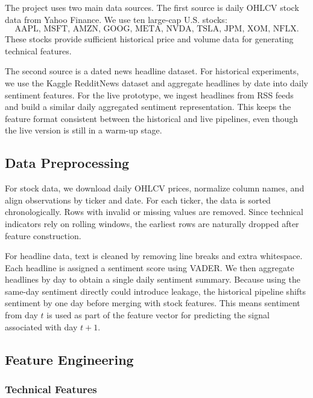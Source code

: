 \documentclass[11pt]{article}
\begin{document}
The project uses two main data sources. The first source is daily OHLCV stock data from Yahoo Finance. We use ten large-cap U.S. stocks:
\[
\text{AAPL, MSFT, AMZN, GOOG, META, NVDA, TSLA, JPM, XOM, NFLX.}
\]
These stocks provide sufficient historical price and volume data for generating technical features.

The second source is a dated news headline dataset. For historical experiments, we use the Kaggle RedditNews dataset and aggregate headlines by date into daily sentiment features. For the live prototype, we ingest headlines from RSS feeds and build a similar daily aggregated sentiment representation. This keeps the feature format consistent between the historical and live pipelines, even though the live version is still in a warm-up stage.

\subsection{Data Preprocessing}

For stock data, we download daily OHLCV prices, normalize column names, and align observations by ticker and date. For each ticker, the data is sorted chronologically. Rows with invalid or missing values are removed. Since technical indicators rely on rolling windows, the earliest rows are naturally dropped after feature construction.

For headline data, text is cleaned by removing line breaks and extra whitespace. Each headline is assigned a sentiment score using VADER. We then aggregate headlines by day to obtain a single daily sentiment summary. Because using the same-day sentiment directly could introduce leakage, the historical pipeline shifts sentiment by one day before merging with stock features. This means sentiment from day $t$ is used as part of the feature vector for predicting the signal associated with day $t+1$.

\subsection{Feature Engineering}

\subsubsection{Technical Features}
\end{document}
